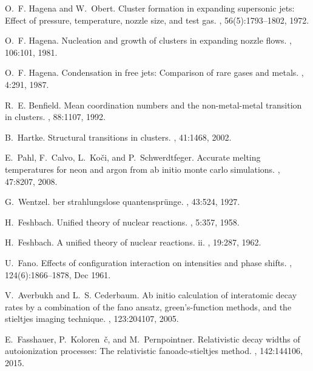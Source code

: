 \documentclass[12pt,twocolumn]{iopart}
\begin{document}
\begin{thebibliography}{10}
O.~F. Hagena and W.~Obert.
\newblock Cluster formation in expanding supersonic jets: Effect of pressure,
  temperature, nozzle size, and test gas.
, 56(5):1793--1802, 1972.

O.~F. Hagena.
\newblock Nucleation and growth of clusters in expanding nozzle flows.
, 106:101, 1981.

O.~F. Hagena.
\newblock Condensation in free jets: Comparison of rare gases and metals.
, 4:291, 1987.

R.~E. Benfield.
\newblock Mean coordination numbers and the non-metal-metal transition in
  clusters.
, 88:1107, 1992.

B.~Hartke.
\newblock Structural transitions in clusters.
, 41:1468, 2002.

E.~Pahl, F.~Calvo, L.~Ko\v{c}i, and P.~Schwerdtfeger.
\newblock Accurate melting temperatures for neon and argon from ab initio monte
  carlo simulations.
, 47:8207, 2008.

G.~Wentzel.
ber strahlungslose quantenspr{\"u}nge.
, 43:524, 1927.

H.~Feshbach.
\newblock Unified theory of nuclear reactions.
, 5:357, 1958.

H.~Feshbach.
\newblock A unified theory of nuclear reactions. ii.
, 19:287, 1962.

U.~Fano.
\newblock Effects of configuration interaction on intensities and phase shifts.
, 124(6):1866--1878, Dec 1961.

V.~Averbukh and L.~S. Cederbaum.
\newblock Ab initio calculation of interatomic decay rates by a combination of
  the fano ansatz, green's-function methods, and the stieltjes imaging
  technique.
, 123:204107, 2005.

E.~Fasshauer, P.~Koloren\ifmmode~\else \v{c}\fi{}, and
  M.~Pernpointner.
\newblock Relativistic decay widths of autoionization processes: The
  relativistic fanoadc-stieltjes method.
, 142:144106, 2015.


\end{thebibliography}
\end{document}
